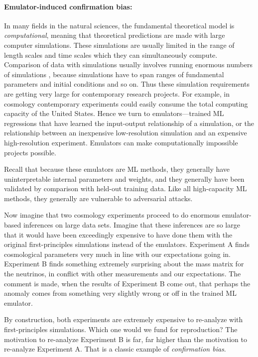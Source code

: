 \documentclass[11pt]{article}
\begin{document}
\paragraph{Emulator-induced confirmation bias:}
In many fields in the natural sciences, the fundamental theoretical model is \emph{computational}, meaning that theoretical predictions are made with large computer simulations.
These simulations are usually limited in the range of length scales and time scales which they can simultaneously compute.
Comparison of data with simulations usually involves running enormous numbers of simulations \cite{sbi}, because simulations have to span ranges of fundamental parameters and initial conditions and so on.
Thus these simulation requirements are getting very large for contemporary research projects.
For example, in cosmology contemporary experiments could easily consume the total computing capacity of the United States.
Hence we turn to emulators---trained ML regressions that have learned the input-output relationship of a simulation, or the relationship between an inexpensive low-resolution simulation and an expensive high-resolution experiment.
Emulators can make computationally impossible projects possible.

Recall that because these emulators are ML methods, they generally have uninterpretable internal parameters and weights, and they generally have been validated by comparison with held-out training data.
Like all high-capacity ML methods, they generally are vulnerable to adversarial attacks.

Now imagine that two cosmology experiments proceed to do enormous emulator-based inferences on large data sets.
Imagine that these inferences are so large that it would have been exceedingly expensive to have done them with the original first-principles simulations instead of the emulators.
Experiment A finds cosmological parameters very much in line with our expectations going in.
Experiment B finds something extremely surprising about the mass matrix for the neutrinos, in conflict with other measurements and our expectations.
The comment is made, when the results of Experiment B come out, that perhaps the anomaly comes from something very slightly wrong or off in the trained ML emulator.

By construction, both experiments are extremely expensive to re-analyze with first-principles simulations.
Which one would we fund for reproduction?
The motivation to re-analyze Experiment B is far, far higher than the motivation to re-analyze Experiment A.
That is a classic example of \emph{confirmation bias}.
\end{document}
